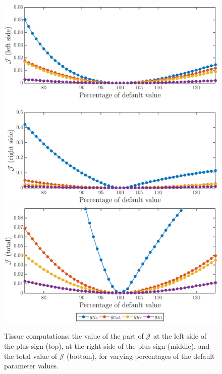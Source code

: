 \documentclass{article}
\begin{document}
\begin{figure}
\includegraphics[trim=0cm 0cm 0cm 1cm, clip=true, width=1\linewidth]{functional_values} 
\includegraphics[trim=0cm 1cm 0cm 1cm, clip=true, width=1\linewidth]{functional_values2} 
    \caption{Tissue computations: the value of the part of $\mathcal{J}$ at the left side of the plus-sign (top), at the right side of the plus-sign (middle), and the total value of $\mathcal{J}$ (bottom), for varying percentages of the default parameter values.}
    \label{fig:9}
\end{figure}
%
\end{document}
